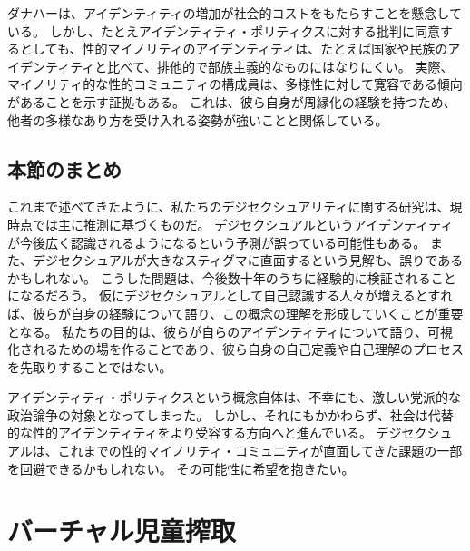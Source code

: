 \documentclass[paper=a4,book,openany]{jlreq}
\begin{document}
ダナハーは、アイデンティティの増加が社会的コストをもたらすことを懸念している。
しかし、たとえアイデンティティ・ポリティクスに対する批判に同意するとしても、性的マイノリティのアイデンティティは、たとえば国家や民族のアイデンティティと比べて、排他的で部族主義的なものにはなりにくい。
実際、マイノリティ的な性的コミュニティの構成員は、多様性に対して寛容である傾向があることを示す証拠もある。
これは、彼ら自身が周縁化の経験を持つため、他者の多様なあり方を受け入れる姿勢が強いことと関係している\citep{flores17:_yes_theres_racis_lgbt_commun}。

\subsection{本節のまとめ}

これまで述べてきたように、私たちのデジセクシュアリティに関する研究は、現時点では主に推測に基づくものだ。
デジセクシュアルというアイデンティティが今後広く認識されるようになるという予測が誤っている可能性もある。
また、デジセクシュアルが大きなスティグマに直面するという見解も、誤りであるかもしれない。
こうした問題は、今後数十年のうちに経験的に検証されることになるだろう。
仮にデジセクシュアルとして自己認識する人々が増えるとすれば、彼らが自身の経験について語り、この概念の理解を形成していくことが重要となる。
私たちの目的は、彼らが自らのアイデンティティについて語り、可視化されるための場を作ることであり、彼ら自身の自己定義や自己理解のプロセスを先取りすることではない。

アイデンティティ・ポリティクスという概念自体は、不幸にも、激しい党派的な政治論争の対象となってしまった。
しかし、それにもかかわらず、社会は代替的な性的アイデンティティをより受容する方向へと進んでいる。
デジセクシュアルは、これまでの性的マイノリティ・コミュニティが直面してきた課題の一部を回避できるかもしれない。
その可能性に希望を抱きたい。

\section{バーチャル児童搾取}
\end{document}
